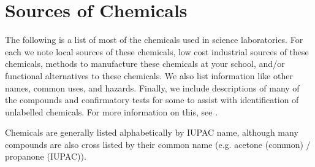 \chapter{Sources of Chemicals}
\label{cha:sourcesofchemicals}
The following is a list of most of the chemicals 
used in science laboratories. 
For each we note local sources of these chemicals, 
low cost industrial sources of these chemicals, 
methods to manufacture these chemicals at your school, 
and/or functional alternatives to these chemicals. 
We also list information like other names, 
common uses, 
and hazards. 
Finally, 
we include descriptions of many of the compounds 
and confirmatory tests for some to assist 
with identification of unlabelled chemicals. 
For more information on this, 
see .

Chemicals are generally listed alphabetically by IUPAC name, 
although many compounds are also cross listed by their common name (e.g. 
acetone (common) / propanone (IUPAC)).\\


